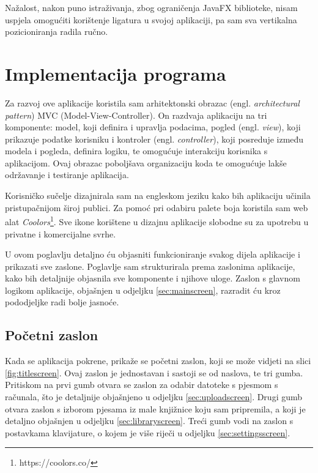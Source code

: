 \documentclass[diplomskirad, upload]{fer}
\begin{document}
Nažalost, nakon puno istraživanja, zbog ograničenja JavaFX biblioteke, nisam uspjela omogućiti korištenje ligatura u svojoj aplikaciji, pa sam sva vertikalna pozicioniranja radila ručno.



\chapter{Implementacija programa}
Za razvoj ove aplikacije koristila sam arhitektonski obrazac (engl. \textit{architectural pattern}) MVC (Model-View-Controller). On razdvaja aplikaciju na tri komponente: model, koji definira i upravlja podacima, pogled (engl. \textit{view}), koji prikazuje podatke korisniku i kontroler (engl. \textit{controller}), koji posreduje između modela i pogleda, definira logiku, te omogućuje interakciju korisnika s aplikacijom. Ovaj obrazac poboljšava organizaciju koda te omogućuje lakše održavanje i testiranje aplikacija.

Korisničko sučelje dizajnirala sam na engleskom jeziku kako bih aplikaciju učinila pristupačnijom široj publici. Za pomoć pri odabiru palete boja koristila sam web alat \textit{Coolors}\footnote{https://coolors.co/}. Sve ikone korištene u dizajnu aplikacije slobodne su za upotrebu u privatne i komercijalne svrhe.

U ovom poglavlju detaljno ću objasniti funkcioniranje svakog dijela aplikacije i prikazati sve zaslone. Poglavlje sam strukturirala prema zaslonima aplikacije, kako bih detaljnije objasnila sve komponente i njihove uloge. Zaslon s glavnom logikom aplikacije, objašnjen u odjeljku \ref{sec:mainscreen}, razradit ću kroz pododjeljke radi bolje jasnoće.

\section{Početni zaslon}
Kada se aplikacija pokrene, prikaže se početni zaslon, koji se može vidjeti na slici \ref{fig:titlescreen}. Ovaj zaslon je jednostavan i sastoji se od naslova, te tri gumba. Pritiskom na prvi gumb otvara se zaslon za odabir datoteke s pjesmom s računala, što je detaljnije objašnjeno u odjeljku \ref{sec:uploadscreen}. Drugi gumb otvara zaslon s izborom pjesama iz male knjižnice koju sam pripremila, a koji je detaljno objašnjen u odjeljku \ref{sec:libraryscreen}. Treći gumb vodi na zaslon s postavkama klavijature, o kojem je više riječi u odjeljku \ref{sec:settingsscreen}.
\end{document}
